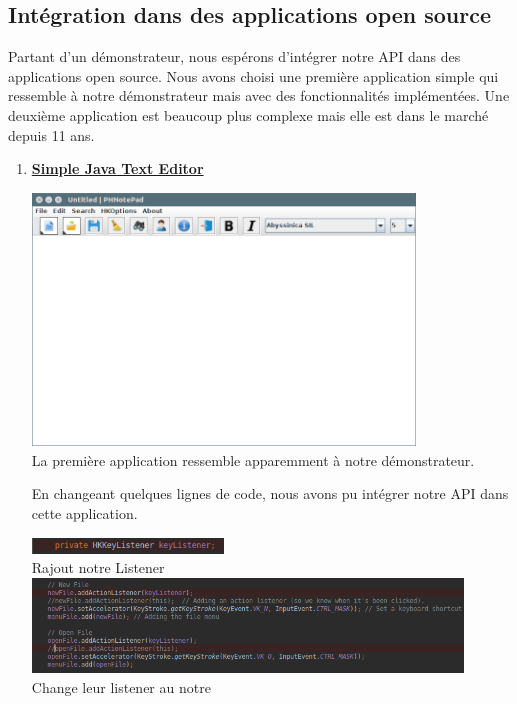 \documentclass[12pt,a4paper]{article}
\begin{document}
\subsection{Intégration dans des applications open source}
Partant d'un démonstrateur, nous espérons d'intégrer notre API dans des applications open source. Nous avons choisi une première application simple qui ressemble à notre démonstrateur mais avec des fonctionnalités implémentées. Une deuxième application est beaucoup plus complexe mais elle est dans le marché depuis 11 ans.
\begin{enumerate}
\item {\large \textbf{\href{https://github.com/pH-7/Simple-Java-Text-Editor}{Simple Java Text Editor}}}\\
\begin{center}
	\includegraphics[width=0.8\textwidth]{01.png}\\
	La première application ressemble apparemment à notre démonstrateur.
\end{center}
En changeant quelques lignes de code, nous avons pu intégrer notre API dans cette application.
\begin{center}
	\includegraphics[width=0.4\textwidth]{02.png}\\
	Rajout notre Listener\\
	\includegraphics[width=0.9\textwidth]{04.png}\\
	Change leur listener au notre\\

\end{center}
\end{enumerate}
\end{document}
